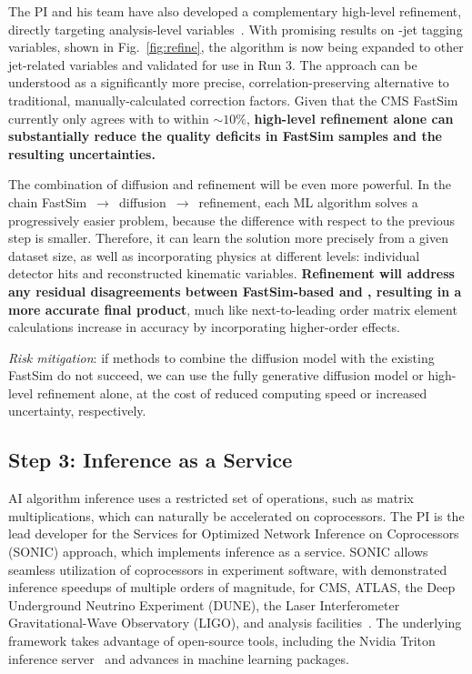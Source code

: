 The PI and his team have also developed a complementary high-level refinement, directly targeting analysis-level variables~\cite{Bein:2023ylt}.
With promising results on \cPqb-jet tagging variables, shown in Fig.~\ref{fig:refine},
the algorithm is now being expanded to other jet-related variables and validated for use in Run 3.
The approach can be understood as a significantly more precise, correlation-preserving alternative to traditional, manually-calculated correction factors.
Given that the CMS FastSim currently only agrees with \GEANTfour to within ${\sim}10\%$,
\textbf{high-level refinement alone can substantially reduce the quality deficits in FastSim samples and the resulting uncertainties.}

The combination of diffusion and refinement will be even more powerful.
In the chain FastSim~$\to$~diffusion~$\to$~refinement, each ML algorithm solves a progressively easier problem,
because the difference with respect to the previous step is smaller.
Therefore, it can learn the solution more precisely from a given dataset size,
as well as incorporating physics at different levels: individual detector hits and reconstructed kinematic variables.
\textbf{Refinement will address any residual disagreements between FastSim-based \diffu and \GEANTfour,
resulting in a more accurate final product}, much like next-to-leading order matrix element calculations increase in accuracy by incorporating higher-order effects.

\textit{Risk mitigation}: if methods to combine the diffusion model with the existing FastSim do not succeed,
we can use the fully generative diffusion model or high-level refinement alone, at the cost of reduced computing speed or increased uncertainty, respectively.

\subsection{Step 3: Inference as a Service}\label{subsec:iaas}

AI algorithm inference uses a restricted set of operations, such as matrix multiplications, which can naturally be accelerated on coprocessors.
The PI is the lead developer for the Services for Optimized Network Inference on Coprocessors (SONIC) approach, which implements inference as a service.
SONIC allows seamless utilization of coprocessors in experiment software, with demonstrated inference speedups of multiple orders of magnitude,
for CMS, ATLAS, the Deep Underground Neutrino Experiment (DUNE), the Laser Interferometer Gravitational-Wave Observatory (LIGO), and analysis facilities~\cite{Duarte:2019fta,Krupa:2020bwg,Wang:2020fjr,Rankin:2020usv,Gunny:2021gne,Cai:2023ldc,CMS:2024twn,Savard:2023wwi}.
The underlying framework takes advantage of open-source tools, including the Nvidia Triton inference server~\cite{nvidia} and advances in machine learning packages.

